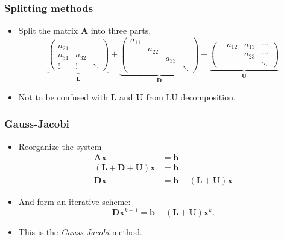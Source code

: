 \begin{frame}
  \frametitle{Splitting methods}
  \begin{itemize}
  \item Split the matrix $\bm A$ into three parts,
    \[
      \underbrace{
        \begin{pmatrix}
          \\
          a_{21} \\
          a_{31} & a_{32} \\
          \vdots & \vdots & \ddots
        \end{pmatrix}
      }_{\bm L}
      +
      \underbrace{
        \begin{pmatrix}
          a_{11} \\
          & a_{22} \\
          && a_{33} \\
          &&& \ddots
        \end{pmatrix}
      }_{\bm D}
      +
      \underbrace{
        \begin{pmatrix}
          & a_{12} & a_{13} & \cdots \\
          && a_{23} & \cdots \\
          &&& \ddots
        \end{pmatrix}
      }_{\bm U}
    \]
  \item Not to be confused with $\bm L$ and $\bm U$ from LU decomposition.
  \end{itemize}
\end{frame}

\begin{frame}
  \frametitle{Gauss-Jacobi}
  \begin{itemize}
  \item Reorganize the system
    \begin{align*}
      \bm A \bm x &= \bm b \\
      (\bm L + \bm D + \bm U) \bm x &= \bm b \\
      \bm D \bm x &= \bm b - (\bm L + \bm U) \bm x
    \end{align*}
  \item And form an iterative scheme:
    \[
      \bm D \bm x^{k+1} = \bm b - (\bm L + \bm U) \bm x^k.
    \]
  \item This is the \emph{Gauss-Jacobi} method.
  \end{itemize}
\end{frame}

